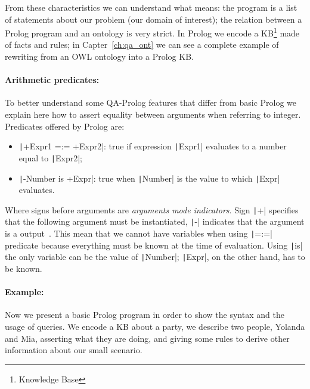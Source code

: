 From these characteristics we can understand what  means: the program is a list of statements about our problem (our domain of interest); the relation between a Prolog program and an ontology is very strict. In Prolog we encode a KB\footnote{Knowledge Base} made of facts and rules; in Capter~\ref{ch:qa_ont} we can see a complete example of rewriting from an OWL ontology into a Prolog KB.

\paragraph{Arithmetic predicates:}\label{par:arithmetic} To better understand some QA-Prolog features that differ from basic Prolog we explain here how to assert equality between arguments when referring to integer. Predicates offered by Prolog are:
\begin{itemize}
	\item \texttt|+Expr1 =:= +Expr2|: true if expression \texttt|Expr1| evaluates to a number equal to \texttt|Expr2|;
	\item   \texttt|-Number is +Expr|: true when \texttt|Number| is the value to which \texttt|Expr| evaluates.
\end{itemize}
Where signs before arguments are \emph{arguments mode indicators}. Sign \texttt|+| specifies that the following argument must be instantiated, \texttt|-| indicates that the argument is a output~\cite{SWI2026PrologManual}. This mean that we cannot have variables when using \texttt|=:=| predicate because everything must be known at the time of evaluation. Using \texttt|is| the only variable can be the value of \texttt|Number|; \texttt|Expr|, on the other hand, has to be known.

\paragraph{Example:} Now we present a basic Prolog program in order to show the syntax and the usage of queries. We encode a KB about a party, we describe two people, Yolanda and Mia, asserting what they are doing, and giving some rules to derive other information about our small scenario.
\begin{listing}[h]
	\caption{Basic KB}
	\label{lst:prolog_kb1}
\end{listing}

